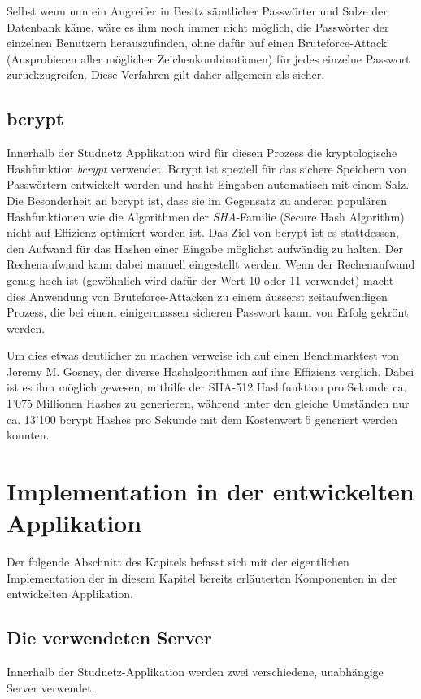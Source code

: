 \documentclass[../main.tex]{subfiles}
\begin{document}
	Selbst wenn nun ein Angreifer in Besitz sämtlicher Passwörter und Salze der Datenbank käme, wäre es ihm noch immer nicht möglich, die Passwörter der einzelnen Benutzern herauszufinden, ohne dafür auf einen Bruteforce-Attack (Ausprobieren aller möglicher Zeichenkombinationen) für jedes einzelne Passwort zurückzugreifen. Diese Verfahren gilt daher allgemein als sicher. \cite{defuse} \cite{security}
	
	\subsection{bcrypt}
	Innerhalb der Studnetz Applikation wird für diesen Prozess die kryptologische Hashfunktion \emph{bcrypt} verwendet. Bcrypt ist speziell für das sichere Speichern von Passwörtern entwickelt worden und hasht Eingaben automatisch mit einem Salz. Die Besonderheit an bcrypt ist, dass sie im Gegensatz zu anderen populären Hashfunktionen wie die Algorithmen der \emph{SHA}-Familie (Secure Hash Algorithm) nicht auf Effizienz optimiert worden ist. Das Ziel von bcrypt ist es stattdessen, den Aufwand für das Hashen einer Eingabe möglichst aufwändig zu halten. Der Rechenaufwand kann dabei manuell eingestellt werden. Wenn der Rechenaufwand genug hoch ist (gewöhnlich wird dafür der Wert 10 oder 11 verwendet) macht dies Anwendung von Bruteforce-Attacken zu einem äusserst zeitaufwendigen Prozess, die bei einem einigermassen sicheren Passwort kaum von Erfolg gekrönt werden. \cite{bcrypt}
	
	Um dies etwas deutlicher zu machen verweise ich auf einen Benchmarktest von Jeremy M. Gosney, der diverse Hashalgorithmen auf ihre Effizienz verglich. Dabei ist es ihm möglich gewesen, mithilfe der SHA-512 Hashfunktion pro Sekunde ca. 1'075 Millionen Hashes zu generieren, während unter den gleiche Umständen nur ca. 13'100 bcrypt Hashes pro Sekunde mit dem Kostenwert 5 generiert werden konnten. \cite{benchmark}
	
	\section{Implementation in der entwickelten Applikation}\label{implementationServer}
	Der folgende Abschnitt des Kapitels befasst sich mit der eigentlichen Implementation der in diesem Kapitel bereits erläuterten Komponenten in der entwickelten Applikation.
	
	
	\subsection{Die verwendeten Server}
	Innerhalb der Studnetz-Applikation werden zwei verschiedene, unabhängige Server verwendet.
	
\end{document}
